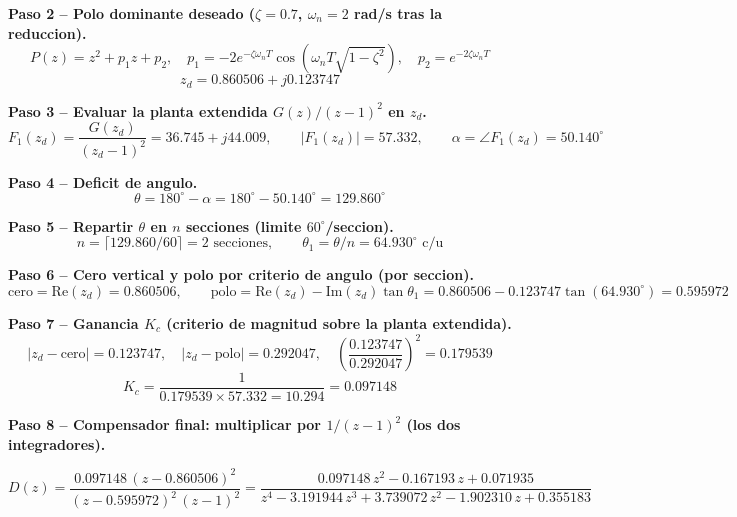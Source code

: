 \documentclass[11pt]{article}
\begin{document}
\textbf{Paso 2 -- Polo dominante deseado ($\zeta=0.7$, $\omega_n=2$ rad/s tras la reduccion).}
\begin{equation}
P(z)=z^2+p_1z+p_2,\quad p_1=-2e^{-\zeta\omega_nT}\cos(\omega_nT\sqrt{1-\zeta^2}),\quad
p_2=e^{-2\zeta\omega_nT}
\end{equation}
\begin{equation}
z_d=0.860506+j0.123747
\end{equation}

\textbf{Paso 3 -- Evaluar la planta extendida $G(z)/(z-1)^2$ en $z_d$.}
\begin{equation}
F_1(z_d)=\frac{G(z_d)}{(z_d-1)^2}=36.745+j44.009,\qquad
|F_1(z_d)|=57.332,\qquad \alpha=\angle F_1(z_d)=50.140^\circ
\end{equation}

\textbf{Paso 4 -- Deficit de angulo.}
\begin{equation}
\theta=180^\circ-\alpha=180^\circ-50.140^\circ=129.860^\circ
\end{equation}

\textbf{Paso 5 -- Repartir $\theta$ en $n$ secciones (limite $60^\circ$/seccion).}
\begin{equation}
n=\lceil 129.860/60\rceil=2\text{ secciones},\qquad
\theta_1=\theta/n=64.930^\circ\text{ c/u}
\end{equation}

\textbf{Paso 6 -- Cero vertical y polo por criterio de angulo (por seccion).}
\begin{equation}
\text{cero}=\mathrm{Re}(z_d)=0.860506,\qquad
\text{polo}=\mathrm{Re}(z_d)-\mathrm{Im}(z_d)\tan\theta_1=0.860506-0.123747\tan(64.930^\circ)=0.595972
\end{equation}

\textbf{Paso 7 -- Ganancia $K_c$ (criterio de magnitud sobre la planta extendida).}
\begin{equation}
|z_d-\text{cero}|=0.123747,\quad |z_d-\text{polo}|=0.292047,\quad
\left(\frac{0.123747}{0.292047}\right)^2=0.179539
\end{equation}
\begin{equation}
K_c=\frac{1}{0.179539\times57.332=10.294}=0.097148
\end{equation}

\textbf{Paso 8 -- Compensador final: multiplicar por $1/(z-1)^2$ (los dos integradores).}
\begin{resultbox}
\begin{equation}
D(z)=\frac{0.097148\,(z-0.860506)^2}{(z-0.595972)^2\,(z-1)^2}
=\frac{0.097148\,z^2-0.167193\,z+0.071935}{z^4-3.191944\,z^3+3.739072\,z^2-1.902310\,z+0.355183}
\end{equation}
\end{resultbox}
\end{document}
